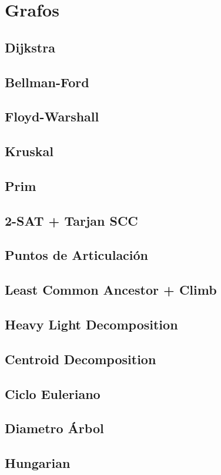\newpage
\section{Grafos}
\subsection{Dijkstra}

\subsection{Bellman-Ford}

\subsection{Floyd-Warshall}

\subsection{Kruskal}

\subsection{Prim}

\subsection{2-SAT + Tarjan SCC}

\subsection{Puntos de Articulaci\'on}

\subsection{Least Common Ancestor + Climb}

\subsection{Heavy Light Decomposition}

\subsection{Centroid Decomposition}

\subsection{Ciclo Euleriano}

\subsection{Diametro \'Arbol}

\subsection{Hungarian}
